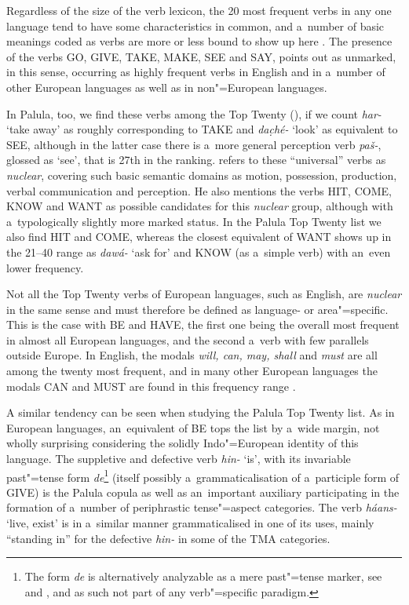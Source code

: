 Regardless of the size of the verb lexicon, the 20 most frequent verbs in any one language tend to have some characteristics in common, and a~number of basic meanings coded as verbs are more or less bound to show up here \citep[209]{viberg2006}. The presence of the verbs GO, GIVE, TAKE, MAKE, SEE and SAY, \citet[247]{viberg1993} points out as unmarked, in this sense, occurring as highly frequent verbs in English and in a~number of other European languages as well as in non"=European languages. 



In Palula, too, we find these verbs among the Top Twenty (), if we count \textit{har-} `take away' as roughly corresponding to TAKE and \textit{dac̣hé-} `look' as equivalent to SEE, although in the latter case there is a~more general perception verb \textit{paš-}, glossed as `see', that is 27th in the ranking. \citet[409]{viberg2006} refers to these ``universal'' verbs as \textit{nuclear}, covering such basic semantic domains as motion, possession, production, verbal communication and perception. He also mentions the verbs HIT, COME, KNOW and WANT as possible candidates for this \textit{nuclear} group, although with a~typologically slightly more marked status. In the Palula Top Twenty list we also find HIT and COME, whereas the closest equivalent of WANT shows up in the 21--40 range as \textit{dawá-} `ask for' and KNOW (as a~simple verb) with an~even lower frequency.



Not all the Top Twenty verbs of European languages, such as English, are \textit{nuclear} in the same sense and must therefore be defined as language- or area"=specific. This is the case with BE and HAVE, the first one being the overall most frequent in almost all European languages, and the second a~verb with few parallels outside Europe. In English, the modals \textit{will, can, may, shall} and \textit{must} are all among the twenty most frequent, and in many other European languages the modals CAN and MUST are found in this frequency range \citep[346--349]{viberg1993}. 



A similar tendency can be seen when studying the Palula Top Twenty list. As in European languages,
an~equivalent of BE tops the list by a~wide margin, not wholly surprising considering the solidly
Indo"=European identity of this language. The suppletive and defective verb \textit{hin-} `is', with its invariable past"=tense form \textit{de}\footnote{The form \textit{de} is alternatively analyzable as a mere past"=tense marker, see  and , and as such not part of any verb"=specific paradigm.} (itself possibly a~grammaticalisation of a~participle form of GIVE) is the Palula copula as well as an~important auxiliary participating in the formation of a~number of periphrastic tense"=aspect categories. The verb \textit{háans-} `live, exist' is in a~similar manner grammaticalised in one of its uses, mainly ``standing in'' for the defective \textit{hin-} in some of the TMA categories.


